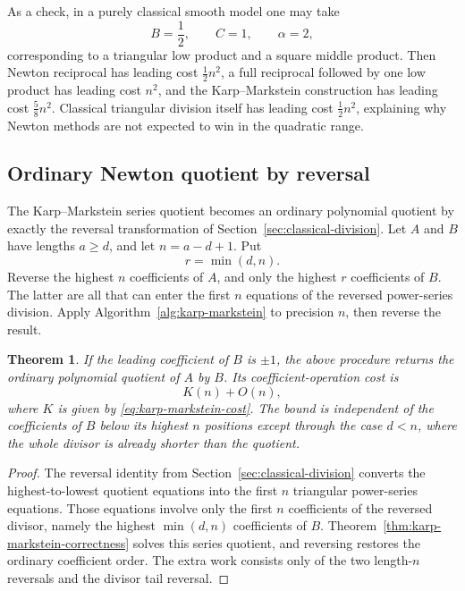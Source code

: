 \documentclass[11pt]{book}
\newtheorem{theorem}{Theorem}[section]
\theoremstyle{definition}
\begin{document}
As a check, in a purely classical smooth model one may take
\[
 B=\frac12,
 \qquad C=1,
 \qquad \alpha=2,
\]
corresponding to a triangular low product and a square middle product.  Then
Newton reciprocal has leading cost $\tfrac12n^2$, a full reciprocal followed
by one low product has leading cost $n^2$, and the Karp--Markstein construction
has leading cost $\tfrac58n^2$.  Classical triangular division itself has
leading cost $\tfrac12n^2$, explaining why Newton methods are not expected to
win in the quadratic range.

\subsection{Ordinary Newton quotient by reversal}

The Karp--Markstein series quotient becomes an ordinary polynomial quotient by
exactly the reversal transformation of Section~\ref{sec:classical-division}.
Let $A$ and $B$ have lengths $a\geq d$, and let $n=a-d+1$.  Put
\[
 r=\min(d,n).
\]
Reverse the highest $n$ coefficients of $A$, and only the highest $r$
coefficients of $B$.  The latter are all that can enter the first $n$ equations
of the reversed power-series division.  Apply
Algorithm~\ref{alg:karp-markstein} to precision $n$, then reverse the result.

\begin{theorem}\label{thm:ordinary-newton-quotient}
If the leading coefficient of $B$ is $\pm1$, the above procedure returns the
ordinary polynomial quotient of $A$ by $B$.  Its coefficient-operation cost is
\[
 K(n)+O(n),
\]
where $K$ is given by \eqref{eq:karp-markstein-cost}.  The bound is independent
of the coefficients of $B$ below its highest $n$ positions except through the
case $d<n$, where the whole divisor is already shorter than the quotient.
\end{theorem}

\begin{proof}
The reversal identity from Section~\ref{sec:classical-division} converts the
highest-to-lowest quotient equations into the first $n$ triangular
power-series equations.  Those equations involve only the first $n$
coefficients of the reversed divisor, namely the highest $\min(d,n)$
coefficients of $B$.  Theorem~\ref{thm:karp-markstein-correctness} solves this
series quotient, and reversing restores the ordinary coefficient order.
The extra work consists only of the two length-$n$ reversals and the divisor
tail reversal.
\end{proof}
\end{document}
